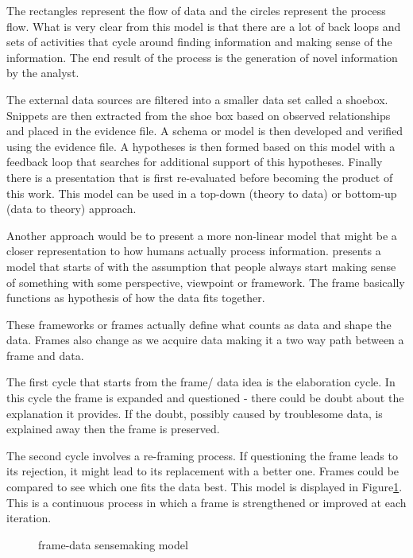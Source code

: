 The rectangles represent the flow of data and the circles represent the process flow. What is very clear from this model is that there are a lot of back loops and sets of activities that cycle around finding information and making sense of the information. The end result of the process is the generation of novel information by the analyst.

The external data sources are filtered into a smaller data set called a shoebox. Snippets are then extracted from the shoe box based on observed relationships and placed in the evidence file. A schema or model is then developed and verified using the evidence file. A hypotheses is then formed based on this model with a feedback loop that searches for additional support of this hypotheses. Finally there is a presentation that is first re-evaluated before becoming the product of this work. This model can be used in a top-down (theory to data)  or bottom-up (data to theory) approach.

Another approach would be to present a more non-linear model that might be a closer representation to how humans actually process information. \cite{klein2006making} presents a model that starts of with the assumption that people always start making sense of something with some perspective, viewpoint or framework. The frame basically functions as hypothesis of how the data fits together.

These frameworks or frames actually define what counts as data and shape the data. Frames also change as we acquire data making it a two way path between a frame and data.

The first cycle that starts from the frame/ data idea is the elaboration cycle. In this cycle the frame is expanded and questioned - there could be doubt about the explanation it provides. If the doubt, possibly caused by troublesome data, is explained away then the frame is preserved.

The second cycle involves a re-framing process. If questioning the frame leads to its rejection, it might lead to its replacement with a better one. Frames could be compared to see which one fits the data best. This model is displayed in Figure\ref{fig:4}. This is a continuous process in which a frame is strengthened or improved at each iteration.


\begin{figure}[!ht]
	\centering{}
	\caption{\cite{klein2006making} frame-data sensemaking model}\label{fig:4}
\end{figure}

